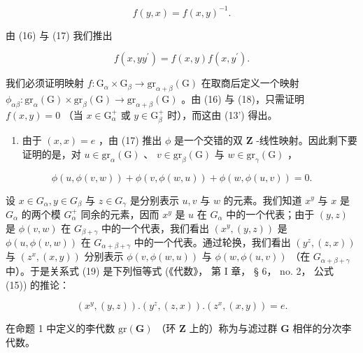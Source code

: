 \[
f (y, x) = f (x, y) ^ {- 1}.\tag{17}
\]

由 (16) 与 (17) 我们推出

\[
f (x, y y ^ {\prime}) = f (x, y) f (x, y ^ {\prime}).\tag{18}
\]

我们必须证明映射 \(f\colon \mathrm{G}_{\alpha}\times \mathrm{G}_{\beta}\to \mathrm{gr}_{\alpha +\beta}(\mathrm{G})\) 在取商后定义一个映射 \(\phi_{\alpha \beta}\colon \mathrm{gr}_{\alpha}(\mathrm{G})\times \mathrm{gr}_{\beta}(\mathrm{G})\to \mathrm{gr}_{\alpha +\beta}(\mathrm{G})\) 。由 (16) 与 (18)，只需证明 \(f(x,y) = 0\) （当 \(x\in \mathrm{G}_{\alpha}^{+}\) 或 \(y\in \mathrm{G}_{\beta}^{+}\) 时），而这由 (13') 得出。

\begin{enumerate}
\def\labelenumi{(\roman{enumi})}
\setcounter{enumi}{1}
\tightlist
\item
  由于 \((x, x) = e\) ，由 (17) 推出 \(\phi\) 是一个交错的双 \(\mathbf{Z}\) -线性映射。因此剩下要证明的是，对 \(u \in \mathrm{gr}_{\alpha}(\mathrm{G})\) 、 \(v \in \mathrm{gr}_{\beta}(\mathrm{G})\) 与 \(w \in \mathrm{gr}_{\gamma}(\mathrm{G})\) ，
\end{enumerate}

\[
\phi (u, \phi (v, w)) + \phi (v, \phi (w, u)) + \phi (w, \phi (u, v)) = 0.\tag{19}
\]

设 \(x \in G_{\alpha}, y \in G_{\beta}\) 与 \(z \in G_{\gamma}\) 是分别表示 \(u, v\) 与 \(w\) 的元素。我们知道 \(x^{y}\) 与 \(x\) 是 \(G_{\alpha}\) 的两个模 \(G_{\alpha}^{+}\) 同余的元素，因而 \(x^{y}\) 是 \(u\) 在 \(G_{\alpha}\) 中的一个代表；由于 \((y, z)\) 是 \(\phi(v, w)\) 在 \(G_{\beta + \gamma}\) 中的一个代表，我们看出 \((x^{y}, (y, z))\) 是 \(\phi(u, \phi(v, w))\) 在 \(G_{\alpha + \beta + \gamma}\) 中的一个代表。通过轮换，我们看出 \((y^{z}, (z, x))\) 与 \((z^{x}, (x, y))\) 分别表示 \(\phi(v, \phi(w, u))\) 与 \(\phi(w, \phi(u, v))\) （在 \(G_{\alpha + \beta + \gamma}\) 中）。于是关系式 (19) 是下列恒等式 (《代数》， 第 I 章， § 6， no. 2， 公式 (15)) 的推论：

\[
\left(x ^ {y}, (y, z)\right). \left(y ^ {z}, (z, x)\right). \left(z ^ {x}, (x, y)\right) = e.\tag{20}
\]

在命题 1 中定义的李代数 \(\mathrm{gr}(\mathbf{G})\) （环 \(\mathbf{Z}\) 上的）称为与滤过群 \(\mathbf{G}\) 相伴的分次李代数。

